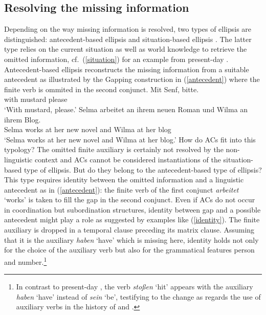 \documentclass[output=paper,colorlinks,citecolor=brown]{langscibook}
\begin{document}
\subsection{Resolving the missing information}

Depending on the way missing information is resolved, two types of ellipsis are distinguished: antecedent-based ellipsis and situation-based ellipsis \citep{reich2011}. The latter type relies on the current situation as well as world knowledge to retrieve the omitted information, cf.\ (\ref{situation}) for an example from present-day . Antecedent-based ellipsis reconstructs the missing information from a suitable antecedent as illustrated by the Gapping construction in (\ref{antecedent}) where the finite verb is ommited in the second conjunct.
\eal
\ex \label{situation}
\gll Mit Senf, bitte.  \\ with mustard please   \\
\glt `With mustard, please.'
\ex  \label{antecedent}
\gll Selma arbeitet an ihrem neuen Roman und Wilma an ihrem Blog. \\ Selma works at her new novel and Wilma at her blog    \\
\glt `Selma works at her new novel and Wilma at her blog.'
\zl
How do ACs fit into this typology? The omitted finite auxiliary is certainly not resolved by the non-linguistic context and ACs cannot be considered instantiations of the situation-based type of ellipsis. But do they belong to the antecedent-based type of ellipsis? This type requires identity between the omitted information and a linguistic antecedent as in (\ref{antecedent}): the finite verb of the first conjunct \textit{arbeitet} `works' is taken to fill the gap in the second conjunct. Even if ACs do not occur in coordination but subordination structures, identity between gap and a possible antecedent might play a role as suggested by examples like (\ref{identity}). The finite auxiliary is dropped in a temporal clause preceding its matrix clause. Assuming that it is the auxiliary \textit{haben} `have' which is missing here, identity holds not only for the choice of the auxiliary verb but also for the grammatical features person and number.\footnote{In contrast to present-day , the verb \textit{stoßen} `hit' appears with the auxiliary \textit{haben} `have' instead of \textit{sein} `be', testifying to the change as regards the use of auxiliary verbs in the history of   \textcite[387]{ERSW93} and \textcite{sapp2011a}.}
\end{document}
